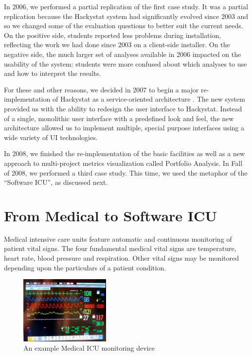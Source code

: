 \documentclass{acm_proc_article-sp}
\begin{document}
In 2006, we performed a partial replication of the first case study.  It
was a partial replication because the Hackystat system had significantly
evolved since 2003 and so we changed some of the evaluation questions to
better suit the current needs.  On the positive side, students reported
less problems during installation, reflecting the work we had done since
2003 on a client-side installer.  On the negative side, the much larger set
of analyses available in 2006 impacted on the usability of the system:
students were more confused about which analyses to use and how to
interpret the results.

For these and other reasons, we decided in 2007 to begin a major
re-implementation of Hackystat as a service-oriented architecture
\cite{csdl2-09-07}. The new system provided us with the ability to redesign
the user interface to Hackystat.  Instead of a single, monolithic user
interface with a predefined look and feel, the new architecture allowed us
to implement multiple, special purpose interfaces using a wide variety of
UI technologies.  

In 2008, we finished the re-implementation of the basic facilities as well
as a new approach to multi-project metrics visualization called Portfolio
Analysis.  In Fall of 2008, we performed a third case study. This time, we used 
the metaphor of the ``Software ICU'', as discussed next.

\section{From Medical to Software ICU}
\label{sec:icu}

Medical intensive care units feature automatic and continuous monitoring of
patient vital signs.  The four fundamental medical vital signs are
temperature, heart rate, blood pressure and respiration.  Other vital signs
may be monitored depending upon the particulars of a patient condition.

\begin{figure}[ht]
  \center
  \includegraphics[width=0.4\textwidth]{micu-screen.eps}
  \caption{An example Medical ICU monitoring device}
  \label{fig:micu}
\end{figure} 
\end{document}
